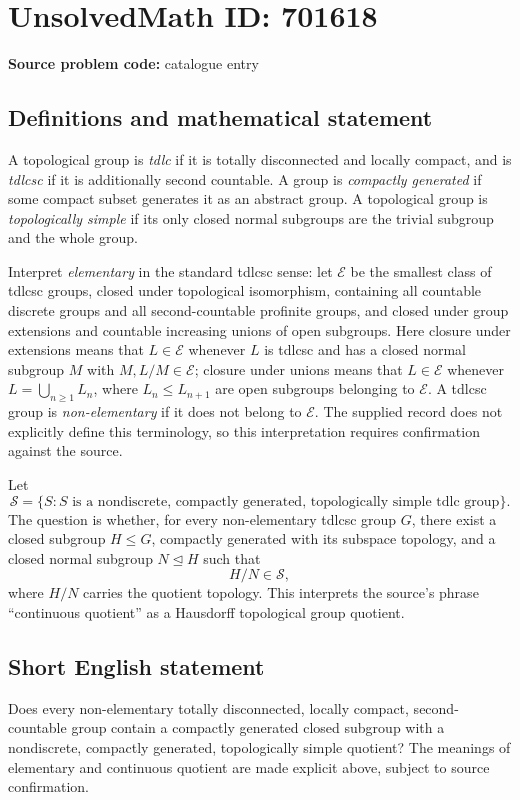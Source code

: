 \documentclass[11pt]{article}
\begin{document}
\section*{UnsolvedMath ID: 701618}
\textbf{Source problem code:} catalogue entry
\subsection{Definitions and mathematical statement}
A topological group is \emph{tdlc} if it is totally disconnected and locally compact, and is \emph{tdlcsc} if it is additionally second countable. A group is \emph{compactly generated} if some compact subset generates it as an abstract group. A topological group is \emph{topologically simple} if its only closed normal subgroups are the trivial subgroup and the whole group.

Interpret \emph{elementary} in the standard tdlcsc sense: let \(\mathcal E\) be the smallest class of tdlcsc groups, closed under topological isomorphism, containing all countable discrete groups and all second-countable profinite groups, and closed under group extensions and countable increasing unions of open subgroups. Here closure under extensions means that \(L\in\mathcal E\) whenever \(L\) is tdlcsc and has a closed normal subgroup \(M\) with \(M,L/M\in\mathcal E\); closure under unions means that \(L\in\mathcal E\) whenever \(L=\bigcup_{n\geq1}L_n\), where \(L_n\leq L_{n+1}\) are open subgroups belonging to \(\mathcal E\). A tdlcsc group is \emph{non-elementary} if it does not belong to \(\mathcal E\). The supplied record does not explicitly define this terminology, so this interpretation requires confirmation against the source.

Let
\[
\mathscr S=\{S: S\text{ is a nondiscrete, compactly generated, topologically simple tdlc group}\}.
\]
The question is whether, for every non-elementary tdlcsc group \(G\), there exist a closed subgroup \(H\leq G\), compactly generated with its subspace topology, and a closed normal subgroup \(N\trianglelefteq H\) such that
\[
H/N\in\mathscr S,
\]
where \(H/N\) carries the quotient topology. This interprets the source's phrase ``continuous quotient'' as a Hausdorff topological group quotient.
\subsection{Short English statement}
Does every non-elementary totally disconnected, locally compact, second-countable group contain a compactly generated closed subgroup with a nondiscrete, compactly generated, topologically simple quotient? The meanings of elementary and continuous quotient are made explicit above, subject to source confirmation.
\end{document}
